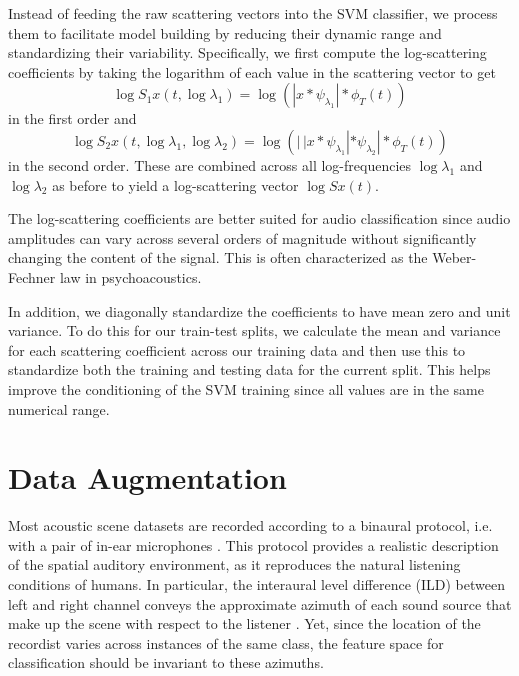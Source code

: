 \documentclass{article}
\newcommand{\lau}{{\lambda_1}}
\newcommand{\lad}{{\lambda_2}}
\begin{document}
\begin{sloppy}
Instead of feeding the raw scattering vectors into the SVM classifier, we process them to facilitate model building by reducing their dynamic range and standardizing their variability. Specifically, we first compute the log-scattering coefficients by taking the logarithm of each value in the scattering vector to get
\begin{equation}
	\log S_1 x(t, \log \lau) = \log \left( | x \ast \psi_\lau | \ast \phi_T(t) \right)
\end{equation}
in the first order and
\begin{equation}
	\log S_2 x(t, \log \lau, \log \lad) = \log \left( |\,| x \ast \psi_\lau | \ast \psi_\lad | \ast \phi_T(t) \right)
\end{equation}
in the second order. These are combined across all log-frequencies $\log \lau$ and $\log \lad$ as before to yield a log-scattering vector $\log Sx(t)$.

The log-scattering coefficients are better suited for audio classification since audio amplitudes can vary across several orders of magnitude without significantly changing the content of the signal. This is often characterized as the Weber-Fechner law in psychoacoustics.

In addition, we diagonally standardize the coefficients to have mean zero and unit variance. To do this for our train-test splits, we calculate the mean and variance for each scattering coefficient across our training data and then use this to standardize both the training and testing data for the current split. This helps improve the conditioning of the SVM training since all values are in the same numerical range.

\section{Data Augmentation}
\label{sec:augment}

Most acoustic scene datasets are recorded according to a binaural protocol, i.e. with a pair of in-ear microphones \cite{Wang2006}.
This protocol provides a realistic description of the spatial auditory environment, as it reproduces the natural listening conditions of humans.
In particular, the interaural level difference (ILD) between left and right channel conveys the approximate azimuth of each sound source that make up the scene with respect to the listener \cite{Blauert2003}.
Yet, since the location of the recordist varies across instances of the same class, the feature space for classification should be invariant to these azimuths.


\end{sloppy}
\end{document}
